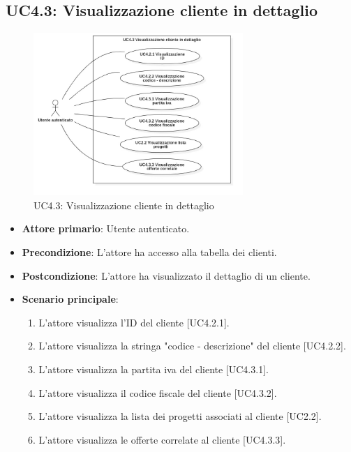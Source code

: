 \pagebreak

\subsection{UC4.3: Visualizzazione cliente in dettaglio}
\begin{figure}[!h]
\centering
\includegraphics[width=300px]{../images/UC/.jpeg/UC4.3.0-visualizzazioneDettaglioCliente.jpg}
\caption{UC4.3: Visualizzazione cliente in dettaglio}
\end{figure}

\begin{itemize}
\item \textbf{Attore primario}: Utente autenticato.
\item \textbf{Precondizione}: L'attore ha accesso alla tabella dei clienti.
\item \textbf{Postcondizione}: L'attore ha visualizzato il dettaglio di un cliente.
\item \textbf{Scenario principale}: 
\begin{enumerate}
\item L'attore visualizza l'ID del cliente [UC4.2.1].
\item L'attore visualizza la stringa "codice - descrizione" del cliente [UC4.2.2].
\item L'attore visualizza la partita iva del cliente [UC4.3.1].
\item L'attore visualizza il codice fiscale del cliente [UC4.3.2].
\item L'attore visualizza la lista dei progetti associati al cliente [UC2.2].
\item L'attore visualizza le offerte correlate al cliente [UC4.3.3].
\end{enumerate}
\end{itemize}

\pagebreak

